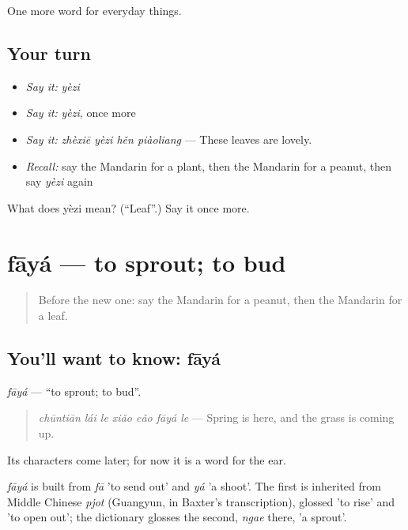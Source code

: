 \begin{grammarlens}[title={What you've built}]
One more word for everyday things.
\end{grammarlens}

\subsection*{Your turn}
\begin{itemize}
\raggedright
  \item \emph{Say it:} \emph{yèzi}
  \item \emph{Say it:} \emph{yèzi}, once more
  \item \emph{Say it:} \emph{zhèxiē yèzi hěn piàoliang} — These leaves are lovely.
  \item \emph{Recall:} say the Mandarin for a plant, then the Mandarin for a peanut, then say \emph{yèzi} again
\end{itemize}

\begin{tcolorbox}[breakable,colback=teal!4,colframe=teal!35!black,title={Before you move on}]
What does yèzi mean? (\textquotedblleft{}Leaf\textquotedblright{}.) Say it once more.
\end{tcolorbox}
\section[fāyá]{fāyá — to sprout; to bud}

\label{lesson:ZH-C237-faya}



\begin{quote}
Before the new one: say the Mandarin for a peanut, then the Mandarin for a leaf.
\end{quote}

\subsection*{You'll want to know: fāyá}
\emph{fāyá} — \textquotedblleft{}to sprout; to bud\textquotedblright{}.

\begin{quote}
\emph{chūntiān lái le xiǎo cǎo fāyá le} — Spring is here, and the grass is coming up.
\end{quote}

Its characters come later; for now it is a word for the ear.

\begin{cousinweb}
\emph{fāyá} is built from \emph{fā} 'to send out' and \emph{yá} 'a shoot'. The first is inherited from Middle Chinese \emph{pjot} (Guangyun, in Baxter's transcription), glossed 'to rise' and 'to open out'; the dictionary glosses the second, \emph{ngae} there, 'a sprout'.
\end{cousinweb}

